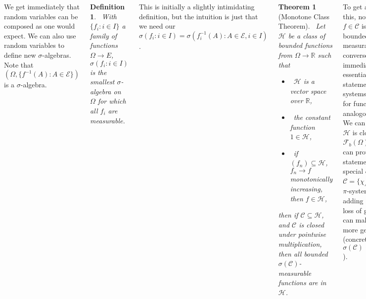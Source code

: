 \documentclass{tikzposter} %
\newtheorem{theorem}{Theorem}
\newtheorem{definition}{Definition}
\begin{document}
\begin{columns}
{    We get immediately that random variables can be composed as one would expect. We can also use random variables to define new $\sigma$-algebras. Note that $(\Omega, \{f^{-1}(A) : A \in \mathcal{E}\})$ is a $\sigma$-algebra. \\

    \begin{definition}
    \ With $\{f_{i} : i \in I\}$ a family of functions $\Omega \to E$, $\sigma(f_{i} : i \in I)$ is the smallest $\sigma$-algebra on $\Omega$ for which all $f_{i}$ are measurable.
    \end{definition}
    \hphantom{}

    This is initially a slightly intimidating definition, but the intuition is just that we need our $\sigma(f_{i} : i \in I) = \sigma(f_{i}^{-1}(A) : A \in \mathcal{E}, i \in I)$. \\

    \begin{theorem}[Monotone Class Theorem]
      \ Let $\mathcal{H}$ be a class of bounded functions from $\Omega \to \mathbb{R}$ such that
      \begin{itemize}
              \item \ $\mathcal{H}$ is a vector space over $\mathbb{R}$,
              \item \ the constant function $1 \in \mathcal{H}$,
              \item \ if $(f_{n}) \subseteq \mathcal{H}$, $f_{n} \to f$ monotonically increasing, then $f \in \mathcal{H}$,
      \end{itemize}
      then if $\mathcal{C} \subseteq \mathcal{H}$, and $\mathcal{C}$ is closed under pointwise multiplication, then all bounded $\sigma(\mathcal{C})$-measurable functions are in $\mathcal{H}$.
    \end{theorem}
    \hphantom{}

    To get an intuition for this, note that any $f \in \mathcal{C}$ is necessarily bounded and $\sigma(\mathcal{C})$-measurable, but the converse is not immediate. Thus we essentially get a statement of the $\lambda$-$\pi$ systems lemma but for functions on analogous systems. \\

    We can firstly see that $\mathcal{H}$ is closed in $\mathcal{F}_{b}(\Omega)$. Then, we can prove the statement for the special case of $\mathcal{C} = \{\chi_{A} : A \in \mathcal{A}\}$ for a $\pi$-system $\mathcal{A}$, then adding $1$ to $\mathcal{C}$ without loss of generality we can make the proof more general (concretely, because $\sigma(\mathcal{C}) \subseteq \sigma(\mathcal{C} \cup \{1\})$). \\

}
\end{columns}
\end{document}
